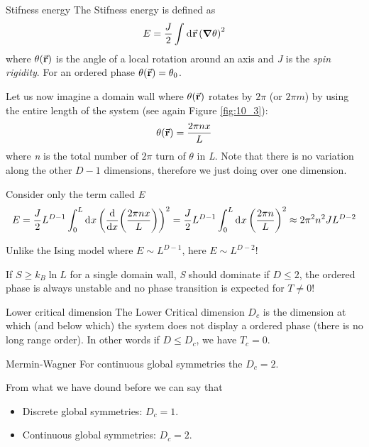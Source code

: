 \documentclass[../main/main.tex]{subfiles}
\begin{document}
\begin{definition}{Stifness energy}{}
  The Stifness energy is defined as
  \begin{equation}
    E = \frac{J}{2} \int_{}^{} \dd[]{\va{r}} \qty(\grad \theta )^2
  \end{equation}
where \( \theta (\va{r})  \) is the angle of a local rotation around an axis and \emph{J} is the \emph{spin rigidity}. For an ordered phase \( \theta (\va{r}) = \theta _0 \).
\end{definition}
Let us now imagine a domain wall where \(\theta (\va{r})  \)  rotates by \( 2 \pi  \) (or \( 2 \pi m \)) by using the entire length of the system (see again Figure \ref{fig:10_3}):
\begin{equation}
  \theta (\va{r}) = \frac{2 \pi n x}{L}
\end{equation}
where \emph{n} is the total number of \( 2 \pi  \) turn of \( \theta  \) in \emph{L}. Note that there is no variation along the other \( D-1 \) dimensions, therefore we just doing over one dimension.

 Consider only the term called \emph{E}
 \begin{equation}
   E = \frac{J}{2} L^{D-1} \int_{0}^{L} \dd[]{x} \qty(\dv{}{x} \qty(\frac{2 \pi n x}{L})  )^2 = \frac{J}{2} L^{D-1} \int_{0}^{L} \dd[]{x} \qty(\frac{2 \pi n}{L})^2 \approx 2 \pi ^2 n^2 J L^{D-2}
 \end{equation}
\begin{remark}
Unlike the Ising model where \( E \sim L^{D-1} \), here \( E \sim L^{D-2} \)!

If \( S \ge k_B \ln{L}  \) for a single domain wall, \emph{S} should dominate if \( D \le 2 \), the ordered phase is always unstable and no phase transition is expected for \( T \neq 0 \)!
\end{remark}

\begin{definition}{Lower critical dimension}
  The Lower Critical dimension \( D_c \) is the dimension at which (and below which) the system does not display a ordered phase (there is no long range order).
  In other words if \( D \le D_c \), we have \( T_c = 0 \).
\end{definition}
\begin{theorem}{Mermin-Wagner}{}
  For continuous global symmetries the \( D_c =2 \).
\end{theorem}

 From what we have dound before we can say that
\begin{itemize}
\item Discrete global symmetries: \( D_c =1 \).
\item Continuous global symmetries: \( D_c =2 \).
\end{itemize}
\end{document}

